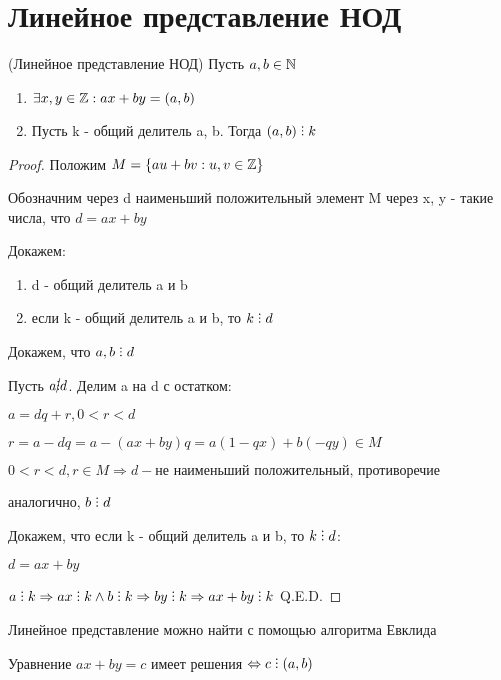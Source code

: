 \section{Линейное представление НОД}

\begin{theorem} (Линейное представление НОД)
  Пусть $a, b \in \mathbb{N}$
  \begin{enumerate}
    \item $\exists x, y \in \mathbb{Z}: ax + by = (a, b)$
    \item Пусть k - общий делитель a, b. Тогда $(a, b) \divby k$
  \end{enumerate}
\end{theorem}

\begin{proof}
  Положим $M = \{au + bv: u, v \in \mathbb{Z}\}$

  Обозначним через d наименьший положительный элемент M через x, y - такие числа, что $d = ax + by$

  Докажем:
  
  \begin{enumerate}
    \item d - общий делитель a и b
    \item если k - общий делитель a и b, то $k \divby d$
  \end{enumerate}

  Докажем, что $a, b \divby d$

  Пусть $a \cancel{\divby} d$. Делим a на d с остатком:

  $a = dq + r, 0 < r < d$

  $r = a - dq = a - (ax + by)q = a(1 - qx) + b(-qy) \in M$

  $0 < r < d, r \in M \Rightarrow d - \text{не наименьший положительный, противоречие}$

  аналогично, $b \divby d$

  Докажем, что если k - общий делитель a и b, то $k \divby d$:

  $d = ax + by$

  $a \divby k \Rightarrow ax \divby k \land b \divby k \Rightarrow by \divby k \Rightarrow ax + by \divby k$ Q.E.D.

\end{proof}

\begin{remark}
  Линейное представление можно найти с помощью алгоритма Евклида
\end{remark}

\begin{remark}
  Уравнение $ax + by = c$ имеет решения $\Leftrightarrow c \divby (a, b)$
\end{remark}

